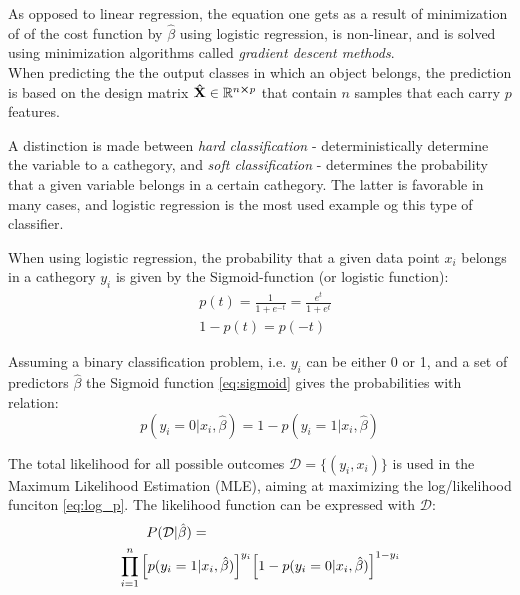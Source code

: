 As opposed to linear regression, the equation one gets as a result of minimization of of the cost function by $\hat{\beta}$ using logistic regression, is non-linear, and is solved using minimization algorithms called \emph{gradient descent methods}. \\

When predicting the the output classes in which an object belongs, the prediction is based on the design matrix $\mathbf{\hat{X}} \in \mathbb{R}^{n\cross p}$ that contain $n$ samples that each carry $p$ features.

A distinction is made between \textit{hard classification} - deterministically determine the variable to a cathegory, and \textit{soft classification} - determines the probability that a given variable belongs in a certain cathegory. The latter is favorable in many cases, and logistic regression is the most used example og this type of classifier.

When using logistic regression, the probability that a given data point $x_i$ belongs in a cathegory $y_i$ is given by the Sigmoid-function (or logistic function):
\begin{equation}
\begin{split}
    & p(t) = \frac{1}{1 + e^{-t}} = \frac{e^t}{1+e^t} \\
    & 1-p(t) = p(-t)
\end{split}
  \label{eq:sigmoid}
\end{equation}

Assuming a binary classification problem, i.e. $y_i$ can be either 0 or 1, and a set of predictors $\hat{\beta}$ the Sigmoid function \eqref{eq:sigmoid} gives the probabilities with relation:
\begin{equation*}
  p(y_i = 0|x_i,\hat{\beta})  = 1 - p(y_i = 1|x_i,\hat{\beta})
  \label{eq:prob_relation}
\end{equation*}

The total likelihood for all possible outcomes $\mathcal{D}=\{(y_i,x_i)\}$ is used in the Maximum Likelihood Estimation (MLE), aiming at maximizing the log/likelihood funciton \eqref{eq:log_p}. The likelihood function can be expressed with $\mathcal{D}$:
\begin{equation*}
\begin{split}
    &\qquad P(\mathcal{D}|\hat{\beta}) = \\
    &\prod_{i=1}^n \qty[p(y_i = 1|x_i,\hat{\beta}) ]^{y_i}  \qty[1 - p(y_i = 0|x_i,\hat{\beta})]^{1-y_i}
\end{split}
\end{equation*}

